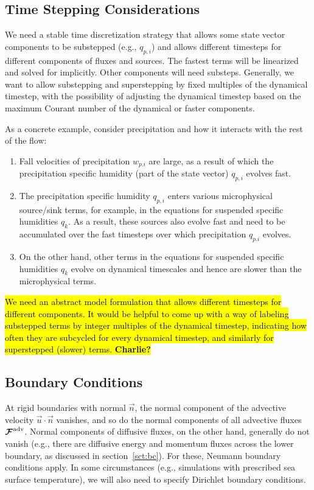 \documentclass{article}
\begin{document}
{\subsection{Time Stepping Considerations}

We need a stable time discretization strategy that allows some state vector components to be substepped (e.g., $q_{p,i}$) and allows different timesteps for different components of fluxes and sources. The fastest terms will be linearized and solved for implicitly. Other components will need substeps. Generally, we want to allow substepping and superstepping by fixed multiples of the dynamical timestep, with the possibility of adjusting the dynamical timestep based on the maximum Courant number of the dynamical or faster components. 

As a concrete example, consider precipitation and how it interacts with the rest of the flow:
\begin{enumerate}
\item Fall velocities of precipitation $w_{p. i}$ are large, as a result of which the precipitation specific humidity (part of the state vector) $q_{p,i}$ evolves fast.
\item The precipitation specific humidity $q_{p,i}$ enters various microphysical source/sink terms, for example, in the equations for suspended specific humidities $q_k$. As a result, these sources also evolve fast and need to be accumulated over the fast timesteps over which precipitation $q_{p.i}$ evolves.
\item On the other hand, other terms in the equations for suspended specific humidities $q_k$ evolve on dynamical timescales and hence are slower than the microphysical terms.
\end{enumerate}
\hl{We need an abstract model formulation that allows different timesteps for different components. It would be helpful to come up with a way of labeling substepped terms by integer multiples of the dynamical timestep, indicating how often they are subcycled for every dynamical timestep, and similarly for superstepped (slower) terms. \textbf{Charlie?}}

\subsection{Boundary Conditions}

At rigid boundaries with normal $\vec{n}$, the normal component of the advective velocity $\vec{u} \cdot \vec{n}$ vanishes, and so do the normal components of all advective fluxes $\boldsymbol{{\mathcal{F}}}^{\mathrm{adv}}$. Normal components of diffusive fluxes, on the other hand, generally do not vanish (e.g., there are diffusive energy and momentum fluxes across the lower boundary, as discussed in section~\ref{sct:bc}). For these, Neumann boundary conditions apply. In some circumstances (e.g., simulations with prescribed sea surface temperature), we will also need to specify Dirichlet boundary conditions. 

}
\end{document}

